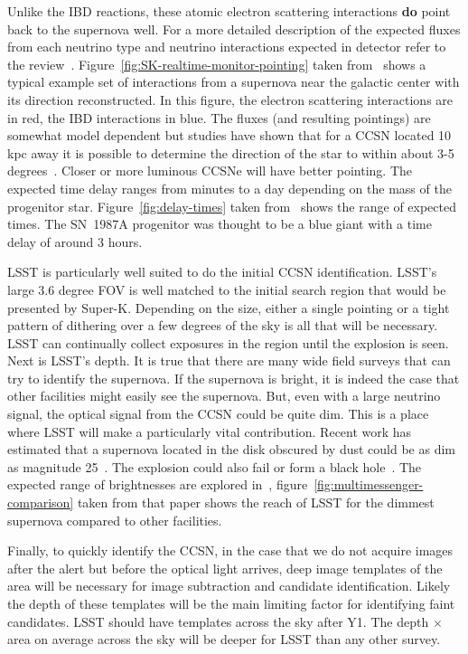 \documentclass[11pt, letterpaper]{article}
\newcommand{\superk}  {Super\nobreakdash-K\xspace}
\begin{document}
Unlike the IBD reactions, these atomic electron scattering
interactions {\bf do} point back to the supernova well.  For a more
detailed description of the expected fluxes from each neutrino type
and neutrino interactions expected in detector refer to the
review~\cite{2012ARNPS..62...81S}.
Figure~\ref{fig:SK-realtime-monitor-pointing} taken
from~\cite{2016APh....81...39A} shows a typical example set of
interactions from a supernova near the galactic center with its
direction reconstructed.  In this figure, the electron scattering
interactions are in red, the IBD interactions in blue.  The fluxes
(and resulting pointings) are somewhat model dependent but studies
have shown that for a CCSN located 10 kpc away it is possible to
determine the direction of the star to within about 3-5
degrees~\cite{2016APh....81...39A}.  Closer or more luminous CCSNe
will have better pointing.  The expected time delay ranges from
minutes to a day depending on the mass of the progenitor
star. Figure~\ref{fig:delay-times} taken
from~\cite{2013ApJ...778...81K} shows the range of expected times.
The SN~1987A progenitor was thought to be a blue giant with a time
delay of around 3 hours.

LSST is particularly well suited to do the initial CCSN
identification.  LSST's large 3.6 degree FOV is well matched to the
initial search region that would be presented by \superk.  Depending
on the size, either a single pointing or a tight pattern of dithering
over a few degrees of the sky is all that will be necessary.  LSST can
continually collect exposures in the region until the explosion is
seen. Next is LSST's depth. It is true that there are many wide field
surveys that can try to identify the supernova.  If the supernova is
bright, it is indeed the case that other facilities might easily see
the supernova.  But, even with a large neutrino signal, the optical
signal from the CCSN could be quite dim.  This is a place where LSST
will make a particularly vital contribution.  Recent work has
estimated that a supernova located in the disk obscured by dust could
be as dim as magnitude 25~\cite{2016MNRAS.461.3296N}.  The explosion
could also  fail or form a black hole~\cite{2011ApJ...730...70O,
  2017hsn..book.1555O}.  The expected range of brightnesses are
explored in~\cite{2016MNRAS.461.3296N},
figure~\ref{fig:multimessenger-comparison} taken from that paper shows
the reach of LSST for the dimmest supernova compared to other
facilities.

Finally, to quickly identify the CCSN, in the case that we do not
acquire images after the alert but before the optical light arrives,
deep image templates of the area will be necessary for image
subtraction and candidate identification.  Likely the depth of these
templates will be the main limiting factor for identifying faint
candidates.  LSST should have templates across the sky after Y1.  The
depth $\times$ area on average across the sky will be deeper for LSST
than any other survey.
\end{document}
